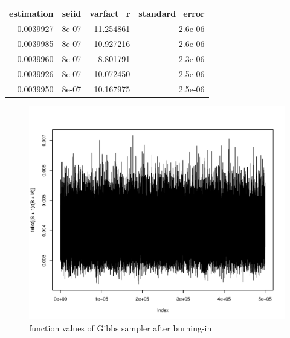 \begin{center}
\begin{knitrout}
\color{fgcolor}
\begin{tabular}{r|r|r|r}
\hline
estimation & seiid & varfact\_r & standard\_error\\
\hline
0.0039927 & 8e-07 & 11.254861 & 2.6e-06\\
\hline
0.0039985 & 8e-07 & 10.927216 & 2.6e-06\\
\hline
0.0039960 & 8e-07 & 8.801791 & 2.3e-06\\
\hline
0.0039926 & 8e-07 & 10.072450 & 2.5e-06\\
\hline
0.0039950 & 8e-07 & 10.167975 & 2.5e-06\\
\hline
\end{tabular}


\end{knitrout}
\end{center}
\begin{figure}[H]
  \centering
\begin{knitrout}
\color{fgcolor}\begin{kframe}
\begin{alltt}
\hlstd{(fnlist[(B}\hlopt{+}\hlstd{)}\hlopt{:}\hlopt{+}\hlstd{M)],}\hlstd{=}\hlstd{)}
\end{alltt}
\end{kframe}
\includegraphics[width=\maxwidth]{figure/p9cplot-1} 

\end{knitrout}
		\caption{function values of Gibbs sampler after burning-in}
\end{figure}
